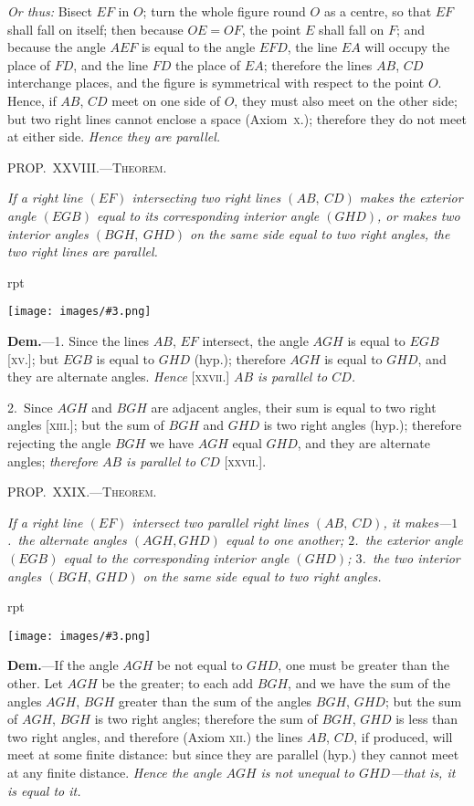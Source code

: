 \documentclass[oneside]{book}
\newcounter{wrapwidth}
\newcommand\mypropl[2]{
\bigskip\Needspace*{4\baselineskip}\begin{center}\textsc{#1}\end{center}
\hspace{\parindent}\emph{#2}\par\medskip
}
\newcommand\imgflow[3]{
\setcounter{wrapwidth}{#1}
\begin{wrapfigure}[#2]{r}{\value{wrapwidth}pt}
\begin{center}
\vspace{-0.3in}
\texttt{[image: images/\#3.png]}
\end{center}
\end{wrapfigure}
}
\begin{document}

\textit{Or thus:} Bisect $EF$ in $O$; turn the whole figure
round $O$ as a centre, so that $EF$ shall fall on itself;
then because $OE = OF$, the point $E$ shall fall on $F$;
and because the angle $AEF$ is equal to the angle $EFD$,
the line $EA$ will occupy the place of $FD$, and the line
$FD$ the place of $EA$; therefore the lines $AB$, $CD$ interchange
places, and the figure is symmetrical with respect
to the point $O$. Hence, if $AB$, $CD$ meet on one
side of $O$, they must also meet on the other side; but
two right lines cannot enclose a space (Axiom~\textsc{x}.);
therefore they do not meet at either side. \textit{Hence they
are parallel.}


\mypropl{PROP\@.~XXVIII\@.---Theorem.}{If a right line $(EF)$ intersecting two right lines $(AB,\ CD)$
makes the exterior angle $(EGB)$ equal to its corresponding
interior angle $(GHD)$, or makes two interior
angles $(BGH,\ GHD)$ on the same side equal to two right
angles, the two right lines are parallel.}

\imgflow{133}{8}{f048}

\textbf{Dem.}---1. Since the lines $AB$, $EF$ intersect, the
angle $AGH$ is equal to $EGB$
[\textsc{xv}.]; but $EGB$ is equal to
$GHD$ (hyp.); therefore $AGH$
is equal to $GHD$, and they
are alternate angles. \textit{Hence}
[\textsc{xxvii}.] \textit{$AB$ is parallel to
$CD$.}

2.~Since $AGH$ and $BGH$
are adjacent angles, their sum is equal to two right
angles [\textsc{xiii}.]; but the sum of $BGH$ and $GHD$ is two
right angles (hyp.); therefore rejecting the angle $BGH$
we have $AGH$ equal $GHD$, and they are alternate
angles; \textit{therefore $AB$ is parallel to $CD$} [\textsc{xxvii}.].



\mypropl{PROP\@.~XXIX\@.---Theorem.}{If a right line $(EF)$ intersect two parallel right lines
$(AB,\ CD)$, it makes---$1$.~the alternate angles $(AGH, GHD)$
equal to one another; $2$.~the exterior angle $(EGB)$ equal
to the corresponding interior angle $(GHD)$; $3$.~the two
interior angles $(BGH,\ GHD)$ on the same side equal to
two right angles.}

\imgflow{135}{8}{f049}

\textbf{Dem.}---If the angle $AGH$ be not equal to $GHD$, one
must be greater than the
other. Let $AGH$ be the
greater; to each add $BGH$,
and we have the sum of the
angles $AGH$, $BGH$ greater
than the sum of the angles
$BGH$, $GHD$; but the sum of
$AGH$, $BGH$ is two right
angles; therefore the sum of $BGH$, $GHD$ is less than
two right angles, and therefore (Axiom \textsc{xii.}) the lines
$AB$, $CD$, if produced, will meet at some finite distance:
but since they are parallel (hyp.) they cannot meet at
any finite distance. \textit{Hence the angle $AGH$ is not unequal
to $GHD$---that is, it is equal to it.}
\end{document}
